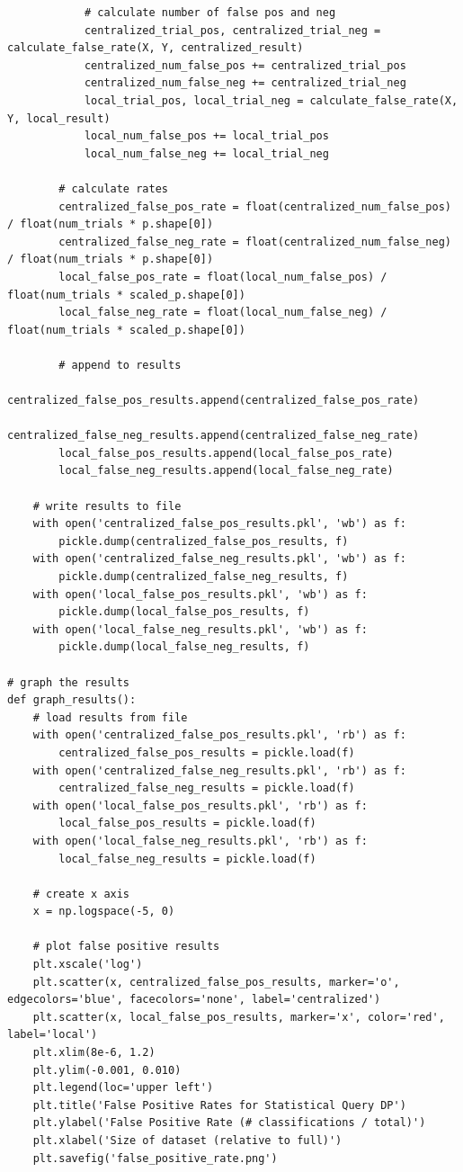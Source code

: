 \documentclass[12pt]{article}
\begin{document}
\begin{appendices}
\begin{lstlisting}
            # calculate number of false pos and neg
            centralized_trial_pos, centralized_trial_neg = calculate_false_rate(X, Y, centralized_result)
            centralized_num_false_pos += centralized_trial_pos
            centralized_num_false_neg += centralized_trial_neg
            local_trial_pos, local_trial_neg = calculate_false_rate(X, Y, local_result)
            local_num_false_pos += local_trial_pos
            local_num_false_neg += local_trial_neg

        # calculate rates
        centralized_false_pos_rate = float(centralized_num_false_pos) / float(num_trials * p.shape[0])
        centralized_false_neg_rate = float(centralized_num_false_neg) / float(num_trials * p.shape[0])
        local_false_pos_rate = float(local_num_false_pos) / float(num_trials * scaled_p.shape[0])
        local_false_neg_rate = float(local_num_false_neg) / float(num_trials * scaled_p.shape[0])

        # append to results
        centralized_false_pos_results.append(centralized_false_pos_rate)
        centralized_false_neg_results.append(centralized_false_neg_rate)
        local_false_pos_results.append(local_false_pos_rate)
        local_false_neg_results.append(local_false_neg_rate)

    # write results to file
    with open('centralized_false_pos_results.pkl', 'wb') as f:
        pickle.dump(centralized_false_pos_results, f)
    with open('centralized_false_neg_results.pkl', 'wb') as f:
        pickle.dump(centralized_false_neg_results, f)
    with open('local_false_pos_results.pkl', 'wb') as f:
        pickle.dump(local_false_pos_results, f)
    with open('local_false_neg_results.pkl', 'wb') as f:
        pickle.dump(local_false_neg_results, f)

# graph the results
def graph_results():
    # load results from file
    with open('centralized_false_pos_results.pkl', 'rb') as f:
        centralized_false_pos_results = pickle.load(f)
    with open('centralized_false_neg_results.pkl', 'rb') as f:
        centralized_false_neg_results = pickle.load(f)
    with open('local_false_pos_results.pkl', 'rb') as f:
        local_false_pos_results = pickle.load(f)
    with open('local_false_neg_results.pkl', 'rb') as f:
        local_false_neg_results = pickle.load(f)

    # create x axis
    x = np.logspace(-5, 0)

    # plot false positive results
    plt.xscale('log')
    plt.scatter(x, centralized_false_pos_results, marker='o', edgecolors='blue', facecolors='none', label='centralized')
    plt.scatter(x, local_false_pos_results, marker='x', color='red', label='local')
    plt.xlim(8e-6, 1.2)
    plt.ylim(-0.001, 0.010)
    plt.legend(loc='upper left')
    plt.title('False Positive Rates for Statistical Query DP')
    plt.ylabel('False Positive Rate (# classifications / total)')
    plt.xlabel('Size of dataset (relative to full)')
    plt.savefig('false_positive_rate.png')


\end{lstlisting}
\end{appendices}
\end{document}
